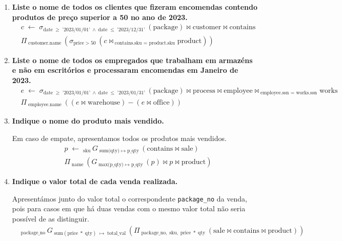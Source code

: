 \documentclass[12pt,a4paper]{article}
\newcommand{\op}{\text}
\begin{document}
  \begin{enumerate}
    \item \textbf{Liste o nome de todos os clientes que fizeram encomendas contendo produtos de preço superior a 50\textmd{\texteuro} no ano de 2023.}
    \[
      \begin{aligned}
        & c \; \leftarrow \; \sigma_{\op{date} \; \geq \; \text{'2023/01/01'} ~\land~ \op{date} \; \leq \; \text{'2023/12/31'} \;}(\op{package}) \bowtie \op{customer} \bowtie \op{contains} \\
        & \Pi _{\; \op{customer.name} \;}( \sigma _{\op{price} \; > \; \op{50} \;} (c \bowtie _{\; \op{contains.sku = product.sku}}\op{product}))
      \end{aligned}
    \]

    \item \textbf{Liste o nome de todos os empregados que trabalham em armazéns e não em escritórios e processaram encomendas em Janeiro de 2023.}
    \[
      \begin{aligned}
        & e \; \leftarrow \; \sigma_{\op{date} \; \geq \; \text{'2023/01/01'} ~\land~ \op{date} \; \leq \; \text{'2023/01/31'} \;}(\op{package}) \bowtie \op{process} \bowtie \op{employee} \bowtie _{\; \op{employee.ssn = works.ssn}} \op{works} \\
        & \Pi _{\; \op{employee.name} \;}((e \bowtie \op{warehouse}) - (e \bowtie \op{office}))
      \end{aligned}
    \]

    \item \textbf{Indique o nome do produto mais vendido.}

    Em caso de empate, apresentamos todos os produtos mais vendidos.
    \[
      \begin{aligned}
        & p \; \leftarrow \; _{\op{sku} \;} G _{\; \op{sum(qty)} \; \mapsto \; \op{p\_qty} \;}(\op{contains} \bowtie \op{sale}) \\
        & \Pi _{\; \op{name} \;}(G _{\; \op{max(p\_qty)} \; \mapsto \; \op{p\_qty} \;}(p) \bowtie p \bowtie \op{product})
      \end{aligned}
    \]

    \item \textbf{Indique o valor total de cada venda realizada.}

    Apresentámos junto do valor total o correspondente \texttt{package\_no} da venda, pois para casos em que
    há duas vendas com o mesmo valor total não seria possível de as distinguir.
    \[
      \begin{aligned}
          & _{\op{package\_no} \;} G _{\; \op{sum}(\op{price} \; * \; \op{qty}) \; \mapsto \; \op{total\_val} \;}(\Pi _{ \; \op{package\_no}, \; \op{sku}, \; \op{price} \; * \; \op{qty} \;}(\op{sale} \bowtie \op{contains} \bowtie \op{product}))
      \end{aligned}
    \]
  \end{enumerate}
\end{document}
